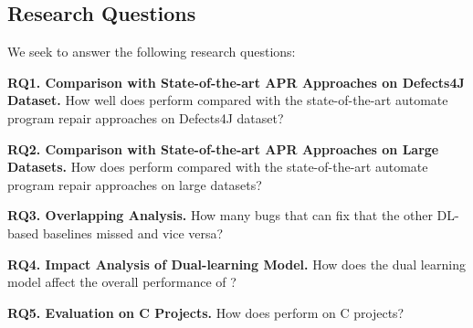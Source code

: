 \subsection{Research Questions}

We seek to answer the following research questions:

\noindent\textbf{RQ1. Comparison with State-of-the-art APR Approaches on Defects4J Dataset.}  How well does {\tool} perform compared with the state-of-the-art automate program repair approaches on Defects4J dataset?


\noindent\textbf{RQ2. Comparison with State-of-the-art APR Approaches
  on Large Datasets.}  How does {\tool} perform compared with the
state-of-the-art automate program repair approaches on large datasets?


\noindent\textbf{RQ3. Overlapping Analysis.} How many bugs that
{\tool} can fix that the other DL-based baselines
                missed and vice versa?

\noindent\textbf{RQ4. Impact Analysis of Dual-learning Model.} How does the dual learning model affect the overall performance of {\tool}?


\noindent\textbf{RQ5. Evaluation on C Projects.} How does {\tool} perform on C projects?
